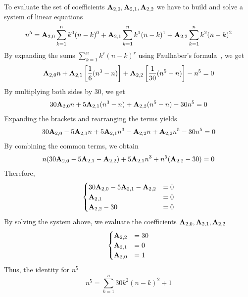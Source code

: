 To evaluate the set of coefficients ${\mathbf{A}} \sb{2,0}, {\mathbf{A}} \sb{2,1}, {\mathbf{A}} \sb{2,2}$
we have to build and solve a system of linear equations
\begin{align*}
    n^5 = {\mathbf{A}} \sb{2,0} \sum_{k=1}^{n} k^0 (n-k)^0 + {\mathbf{A}} \sb{2,1} \sum_{k=1}^{n} k^1 (n-k)^1 + {\mathbf{A}} \sb{2,2} \sum_{k=1}^{n} k^2 (n-k)^2
\end{align*}
By expanding the sums $\sum_{k=1}^{n} k^r (n-k)^r$ using Faulhaber's formula~\cite{beardon1996sums}, we get
\begin{equation*}
    {\mathbf{A}} \sb{2,0} n
    + {\mathbf{A}} \sb{2,1} \left[ \frac{1}{6} (n^3-n) \right]
    + {\mathbf{A}} \sb{2,2} \left[ \frac{1}{30} (n^5-n) \right] - n^5 = 0
\end{equation*}
By multiplying both sides by $30$, we get
\begin{equation*}
    30 {\mathbf{A}} \sb{2,0} n + 5 {\mathbf{A}} \sb{2,1} (n^3-n) + {\mathbf{A}} \sb{2,2} (n^5-n) - 30n^5 = 0
\end{equation*}
Expanding the brackets and rearranging the terms yields
\begin{equation*}
    30 {\mathbf{A}} \sb{2,0} - 5 {\mathbf{A}} \sb{2,1} n + 5 {\mathbf{A}} \sb{2,1} n^3 - {\mathbf{A}} \sb{2,2} n + {\mathbf{A}} \sb{2,2} n^5 - 30n^5 = 0
\end{equation*}
By combining the common terms, we obtain
\begin{equation*}
    n (30 {\mathbf{A}} \sb{2,0} - 5 {\mathbf{A}} \sb{2,1} - {\mathbf{A}} \sb{2,2}) + 5 {\mathbf{A}} \sb{2,1} n^3 + n^5 ({\mathbf{A}} \sb{2,2} - 30) = 0
\end{equation*}
Therefore,
\begin{equation*}
    \begin{cases}
        30 {\mathbf{A}} \sb{2,0} - 5 {\mathbf{A}} \sb{2,1} - {\mathbf{A}} \sb{2,2} &= 0 \\
        {\mathbf{A}} \sb{2,1} &= 0 \\
        {\mathbf{A}} \sb{2,2} - 30 &= 0
    \end{cases}
\end{equation*}
By solving the system above, we evaluate the coefficients ${\mathbf{A}} \sb{2,0}, {\mathbf{A}} \sb{2,1}, {\mathbf{A}} \sb{2,2}$
\begin{equation*}
    \begin{cases}
        {\mathbf{A}} \sb{2,2} &= 30 \\
        {\mathbf{A}} \sb{2,1} &= 0 \\
        {\mathbf{A}} \sb{2,0} &= 1
    \end{cases}
\end{equation*}
Thus, the identity for $n^5$
\begin{equation*}
    n^5 = \sum_{k=1}^{n} 30k^2(n-k)^2 + 1
\end{equation*}
